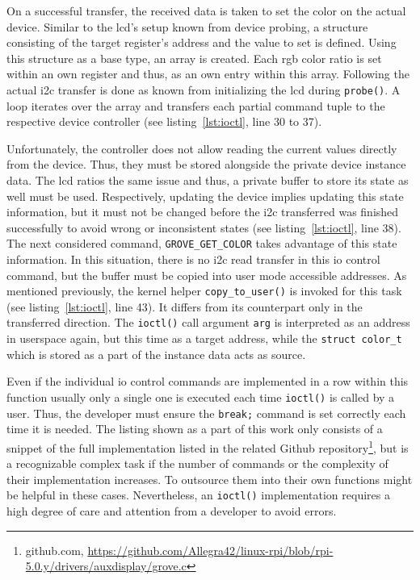 On a successful transfer, the received data is taken to set the color on the actual device.
Similar to the \ac{lcd}'s setup known from device probing, a structure consisting of the target register's address and the value to set is defined.
Using this structure as a base type, an array is created.
Each \ac{rgb} color ratio is set within an own register and thus, as an own entry within this array.
Following the actual \ac{i2c} transfer is done as known from initializing the \ac{lcd} during \texttt{probe()}.
A loop iterates over the array and transfers each partial command tuple to the respective device controller (see listing~\ref{lst:ioctl}, line 30 to 37).

Unfortunately, the controller does not allow reading the current values directly from the device.
Thus, they must be stored alongside the private device instance data.
The \ac{lcd} ratios the same issue and thus, a private buffer to store its state as well must be used.
Respectively, updating the device implies updating this state information, but it must not be changed before the \ac{i2c} transferred was finished successfully to avoid wrong or inconsistent states (see listing~\ref{lst:ioctl}, line 38).
The next considered command, \texttt{GROVE_GET_COLOR} takes advantage of this state information.
In this situation, there is no \ac{i2c} read transfer in this \ac{io} control command, but the buffer must be copied into user mode accessible addresses.
As mentioned previously, the kernel helper \texttt{copy_to_user()} is invoked for this task (see listing~\ref{lst:ioctl}, line 43).
It differs from its counterpart only in the transferred direction.
The \texttt{ioctl()} call argument \texttt{arg} is interpreted as an address in userspace again, but this time as a target address, while the \texttt{struct color_t} which is stored as a part of the instance data acts as source.

Even if the individual \ac{io} control commands are implemented in a row within this function usually only a single one is executed each time \texttt{ioctl()} is called by a user.
Thus, the developer must ensure the \texttt{break;} command is set correctly each time it is needed.
The listing shown as a part of this work only consists of a snippet of the full implementation listed in the related Github repository\footnote{github.com, \url{https://github.com/Allegra42/linux-rpi/blob/rpi-5.0.y/drivers/auxdisplay/grove.c}}, but is a recognizable complex task if the number of commands or the complexity of their implementation increases. 
To outsource them into their own functions might be helpful in these cases. 
Nevertheless, an \texttt{ioctl()} implementation requires a high degree of care and attention from a developer to avoid errors.
